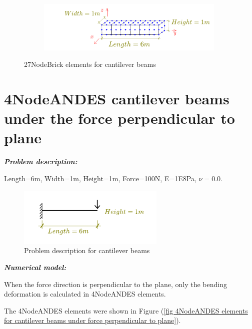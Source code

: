 \documentclass[fleqn,11pt,letter]{article}
\begin{document}
\begin{figure}[H]
  \centering
  \begin{subfigure}{0.5\textwidth}
    \centering
    \includegraphics[width=9cm]{../Figure_files/27NodeBrick/beam_27brick_6div.pdf}
  \end{subfigure}
  \captionsetup{justification=centering,margin=3cm}
  \caption{27NodeBrick elements for cantilever beams}
  \label{fig 8NodeBrick elements for cantilever beams 27brick}
\end{figure}




\newpage
\section{4NodeANDES cantilever beams under the force perpendicular to plane}


\emph{\textbf{Problem description:}}


Length=6m, Width=1m, Height=1m, Force=100N, E=1E8Pa, $\nu=0.0$. 

\begin{figure}[H]
  \centering
  \includegraphics[width=7cm]{../Figure_files/4NodeANDES/cantilever_6.pdf}
  \caption{Problem description for cantilever beams}
  \label{fig Problem description for cantilever 4}
\end{figure}


\noindent \emph{\textbf{Numerical model:}}

\vskip 12pt


When the force direction is perpendicular to the plane, only the bending deformation is calculated in 4NodeANDES elements. 


The 4NodeANDES elements were shown in Figure (\ref{fig 4NodeANDES elements for cantilever beams under force perpendicular to plane}).
\end{document}
